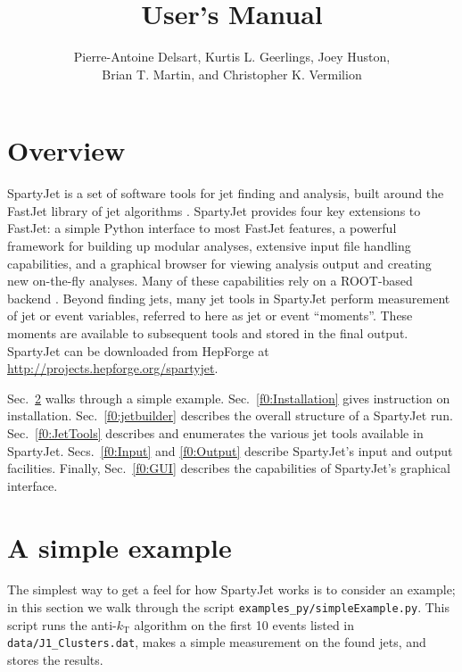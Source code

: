 \documentclass{article}
\title{\SJ 4.0 User's Manual}
\author{Pierre-Antoine Delsart, Kurtis L. Geerlings, Joey Huston,\\Brian T. Martin, and Christopher K. Vermilion}
\newcommand{\prog}[1]{{\sc #1}\xspace}
\newcommand{\SJ}[0]{\prog{SpartyJet}}
\newcommand{\FJ}[0]{\prog{FastJet}}
\begin{document}
\maketitle
\tableofcontents

\section{Overview}

\SJ is a set of software tools for jet finding and analysis, built around the \FJ library of jet algorithms \cite{FastJet,FastJetWebsite}.  \SJ provides four key extensions to \FJ:  a simple Python interface to most \FJ features,  a powerful framework for building up modular analyses, extensive input file handling capabilities, and a graphical browser for viewing analysis output and creating new on-the-fly analyses.  Many of these capabilities rely on a \prog{ROOT}-based backend \cite{ROOT}.  Beyond finding jets, many jet tools in \SJ perform measurement of jet or event variables, referred to here as jet or event ``moments''.  These moments are available to subsequent tools and stored in the final output.  \SJ can be downloaded from HepForge at \url{http://projects.hepforge.org/spartyjet}.

Sec.~\ref{sec:example} walks through a simple example.  Sec.~\ref{f0:Installation} gives instruction on installation.  Sec.~\ref{f0:jetbuilder} describes the overall structure of a \SJ run.  Sec.~\ref{f0:JetTools} describes and enumerates the various jet tools available in \SJ.  Secs.~\ref{f0:Input} and \ref{f0:Output} describe \SJ's input and output facilities.  Finally, Sec.~\ref{f0:GUI} describes the capabilities of \SJ's graphical interface.



\section{A simple example}
\label{sec:example}

The simplest way to get a feel for how \SJ works is to consider an example; in this section we walk through the script \verb+examples_py/simpleExample.py+.  This script runs the anti-$k_\text{T}$ algorithm on the first 10 events listed in \verb+data/J1_Clusters.dat+, makes a simple measurement on the found jets, and stores the results.
\end{document}
